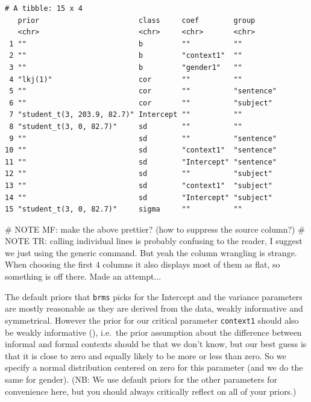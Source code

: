 \documentclass[
  doc,
  floatsintext,
  longtable,
  nolmodern,
  notxfonts,
  notimes,
  colorlinks=true,linkcolor=blue,citecolor=blue,urlcolor=blue]{apa7}
\newenvironment{Shaded}{\begin{snugshade}}{\end{snugshade}}
\newcommand{\AlertTok}[1]{\textcolor[rgb]{0.68,0.00,0.00}{#1}}
\newcommand{\CommentTok}[1]{\textcolor[rgb]{0.37,0.37,0.37}{#1}}
\begin{document}
\begin{verbatim}
# A tibble: 15 x 4
   prior                       class     coef        group     
   <chr>                       <chr>     <chr>       <chr>     
 1 ""                          b         ""          ""        
 2 ""                          b         "context1"  ""        
 3 ""                          b         "gender1"   ""        
 4 "lkj(1)"                    cor       ""          ""        
 5 ""                          cor       ""          "sentence"
 6 ""                          cor       ""          "subject" 
 7 "student_t(3, 203.9, 82.7)" Intercept ""          ""        
 8 "student_t(3, 0, 82.7)"     sd        ""          ""        
 9 ""                          sd        ""          "sentence"
10 ""                          sd        "context1"  "sentence"
11 ""                          sd        "Intercept" "sentence"
12 ""                          sd        ""          "subject" 
13 ""                          sd        "context1"  "subject" 
14 ""                          sd        "Intercept" "subject" 
15 "student_t(3, 0, 82.7)"     sigma     ""          ""        
\end{verbatim}

\begin{Shaded}
\begin{Highlighting}[]
\CommentTok{\# }\AlertTok{NOTE}\CommentTok{ MF: make the above prettier? (how to suppress the \textasciigrave{}source\textasciigrave{} column?)}
\CommentTok{\# }\AlertTok{NOTE}\CommentTok{ TR: calling individual lines is probably confusing to the reader, I suggest we just using the generic command. But yeah the column wrangling is strange. When choosing the first 4 columns it also displays most of them as flat, so something is off there. Made an attempt...}
\end{Highlighting}
\end{Shaded}

The default priors that \texttt{brms} picks for the Intercept and the
variance parameters are mostly reasonable as they are derived from the
data, weakly informative and symmetrical. However the prior for our
critical parameter \texttt{context1} should also be weakly informative
(), i.e.~the prior assumption about the difference between informal
and formal contexts should be that we don't know, but our best guess is
that it is close to zero and equally likely to be more or less than
zero. So we specify a normal distribution centered on zero for this
parameter (and we do the same for gender). (NB: We use default priors
for the other parameters for convenience here, but you should always
critically reflect on all of your priors.)
\end{document}
